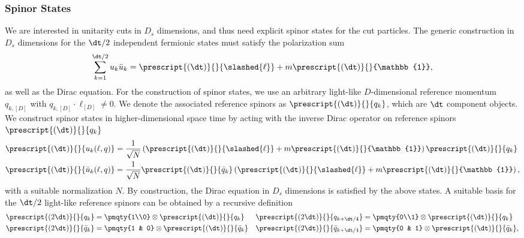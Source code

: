 \subsubsection{Spinor States}
\label{sec:fermionic-states}
We are interested in unitarity cuts in $D_s$ dimensions, and thus need explicit spinor
states for the cut particles. The generic construction in $D_s$ dimensions for the $\dt/2$ independent fermionic states must satisfy the polarization sum
\begin{align}\label{eq:qpolsumd}
  \sum_{k=1}^{\dt/2}u_{k}\bar{u}_{k}=
  \prescript{(\dt)}{}{\slashed{\ell}}+m \prescript{(\dt)}{}{\mathbb{1}},
\end{align}
as well as the Dirac equation. 
For the construction of spinor states, we use an arbitrary light-like $D$-dimensional reference
momentum $q_{k,[D]}$ with $q_{k,[D]}\cdot \ell_{[D]} \neq0$. We denote
the associated reference spinors as $\prescript{(\dt)}{}{q_k}$, which are
$\dt$ component objects. We construct spinor states in
higher-dimensional space time by acting with
the inverse Dirac operator on reference spinors
$\prescript{(\dt)}{}{q_k}$ 
\begin{subequations}
\begin{align}\label{eq:spconst}
  \prescript{(\dt)}{}{u_k(\ell,q)} &=
  \frac{1}{\sqrt{N}}\left(\prescript{(\dt)}{}{\slashed{\ell}}+m\prescript{(\dt)}{}{\mathbb{1}}\right)\prescript{(\dt)}{}{q_{k}}\\
\prescript{(\dt)}{}{\bar{u}_k(\ell,q)} &=\frac{1}{\sqrt{N}}\prescript{(\dt)}{}{\bar{q}_{k}}\left(\prescript{(\dt)}{}{\slashed{\ell}}+m\prescript{(\dt)}{}{\mathbb{1}}\right),
\end{align}
\end{subequations}
with a suitable normalization $N$. By construction, the Dirac
equation in $D_s$ dimensions is satisfied by the above states. A
suitable basis for the $\dt/2$ light-like reference spinors can be
obtained by a recursive definition
\begin{subequations}
\begin{align}
    \prescript{(2\dt)}{}{q_{k}} &= \pmqty{1\\0} \otimes   \prescript{(\dt)}{}{q_{k}} &   \prescript{(2\dt)}{}{q_{k+\dt/4}} &=  \pmqty{0\\1}\otimes   \prescript{(\dt)}{}{q_{k}} \\
    \prescript{(2\dt)}{}{\bar{q}_{k}} &= \pmqty{1 & 0}\otimes   \prescript{(\dt)}{}{\bar{q}_{k}} &   \prescript{(2\dt)}{}{\bar{q}_{k+\dt/4}} &= \pmqty{0 & 1} \otimes   \prescript{(\dt)}{}{\bar{q}_{k}},
\end{align}
\end{subequations}
